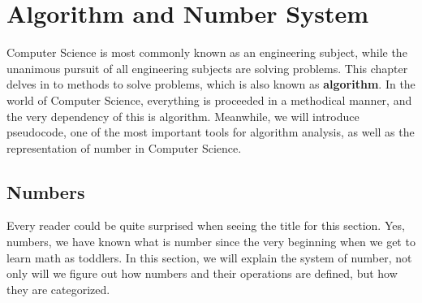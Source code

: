 \chapterspaceabove{5.75cm} %
\chapterspacebelow{10cm} %
\chapter{Algorithm and Number System}

Computer Science is most commonly known as an engineering subject, while the unanimous pursuit of all engineering subjects are solving problems. This chapter delves in to methods to solve problems, which is also known as \textbf{algorithm}. In the world of Computer Science, everything is proceeded in a methodical manner, and the very dependency of this is algorithm. Meanwhile, we will introduce pseudocode, one of the most important tools for algorithm analysis, as well as the representation of number in Computer Science.


\section{Numbers}
Every reader could be quite surprised when seeing the title for this section. Yes, numbers, we have known what is number since the very beginning when we get to learn math as toddlers. In this section, we will explain the system of number, not only will we figure out how numbers and their operations are defined, but how they are categorized.
